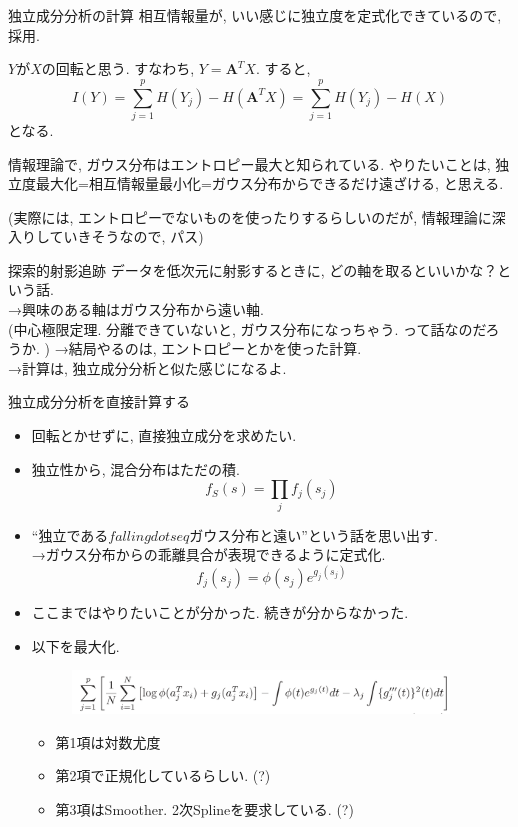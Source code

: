 \documentclass[dvipdfmx,8pt]{beamer}
\begin{document}
  \begin{frame}{独立成分分析の計算}
    相互情報量が, いい感じに独立度を定式化できているので, 採用.

    $Y$が$X$の回転と思う. すなわち, $Y=\mathbf{A}^TX$.
    すると,
    \[
      I(Y)=\sum_{j=1}^pH(Y_j)-H(\mathbf{A}^TX)=\sum_{j=1}^pH(Y_j)-H(X)
    \]
    となる.

    情報理論で, ガウス分布はエントロピー最大と知られている.
    やりたいことは, 独立度最大化=相互情報量最小化=ガウス分布からできるだけ遠ざける, と思える.

    (実際には, エントロピーでないものを使ったりするらしいのだが, 情報理論に深入りしていきそうなので, パス)
  \end{frame}
  \begin{frame}{探索的射影追跡}
    データを低次元に射影するときに, どの軸を取るといいかな？という話.\\
    →興味のある軸はガウス分布から遠い軸.\\
    (中心極限定理. 分離できていないと, ガウス分布になっちゃう. って話なのだろうか. )
    →結局やるのは, エントロピーとかを使った計算.\\
    →計算は, 独立成分分析と似た感じになるよ.

  \end{frame}
  \begin{frame}{独立成分分析を直接計算する}
    \begin{itemize}
      \item 回転とかせずに, 直接独立成分を求めたい.
      \item 独立性から, 混合分布はただの積.
        \[
          f_S(s)=\prod_jf_j(s_j)
        \]
      \item ``独立である$fallingdotseq$ガウス分布と遠い''という話を思い出す.\\
        →ガウス分布からの乖離具合が表現できるように定式化.
        \[
          f_j(s_j)=\phi(s_j)e^{g_j(s_j)}
        \]
      \item ここまではやりたいことが分かった. 続きが分からなかった.
      \item 以下を最大化.
        \begin{figure}[htb]
          \centering
          \includegraphics[width=10cm,clip]{images/prodenica.png}
        \end{figure}
        \begin{itemize}
          \item 第1項は対数尤度
          \item 第2項で正規化しているらしい. (?)
          \item 第3項はSmoother. 2次Splineを要求している. (?)
        \end{itemize}
    \end{itemize}
  \end{frame}
\end{document}

